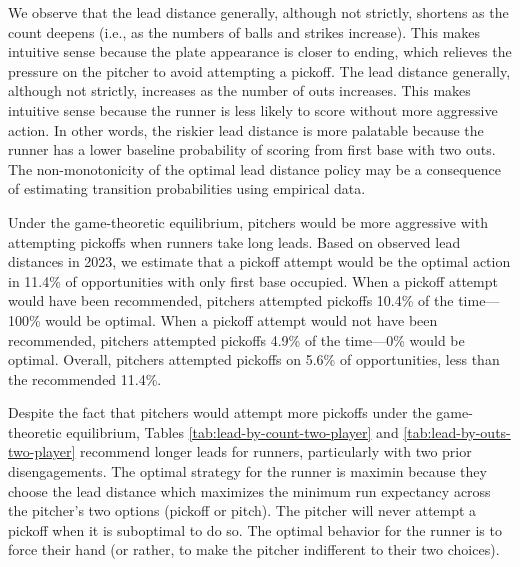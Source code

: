 \documentclass[11pt]{article}
\newcommand{\tablepath}{tables/}
\newcommand{\inputtable}[1]{}
\begin{document}
      \begin{table}
        \centering
        \inputtable{lead_by_outs_two_player.tex}
        \caption{
          \it The optimal lead distance (in feet) by outs and prior disengagements under the two-player sequential game, assuming an average runner on first base facing an average battery (pitcher and catcher) with an 0-0 count and third base empty.
        }
        \label{tab:lead-by-outs-two-player}
      \end{table}

      We observe that the lead distance generally, although not strictly, shortens as the count deepens (i.e., as the numbers of balls and strikes increase). This makes intuitive sense because the plate appearance is closer to ending, which relieves the pressure on the pitcher to avoid attempting a pickoff. The lead distance generally, although not strictly, increases as the number of outs increases. This makes intuitive sense because the runner is less likely to score without more aggressive action. In other words, the riskier lead distance is more palatable because the runner has a lower baseline probability of scoring from first base with two outs. The non-monotonicity of the optimal lead distance policy may be a consequence of estimating transition probabilities using empirical data.

      Under the game-theoretic equilibrium, pitchers would be more aggressive with attempting pickoffs when runners take long leads. Based on observed lead distances in 2023, we estimate that a pickoff attempt would be the optimal action in 11.4\% of opportunities with only first base occupied. When a pickoff attempt would have been recommended, pitchers attempted pickoffs 10.4\% of the time---100\% would be optimal. When a pickoff attempt would not have been recommended, pitchers attempted pickoffs 4.9\% of the time---0\% would be optimal. Overall, pitchers attempted pickoffs on 5.6\% of opportunities, less than the recommended 11.4\%.
      

      Despite the fact that pitchers would attempt more pickoffs under the game-theoretic equilibrium, Tables \ref{tab:lead-by-count-two-player} and \ref{tab:lead-by-outs-two-player} recommend longer leads for runners, particularly with two prior disengagements. The optimal strategy for the runner is maximin because they choose the lead distance which maximizes the minimum run expectancy across the pitcher's two options (pickoff or pitch). The pitcher will never attempt a pickoff when it is suboptimal to do so. The optimal behavior for the runner is to force their hand (or rather, to make the pitcher indifferent to their two choices).
\end{document}
